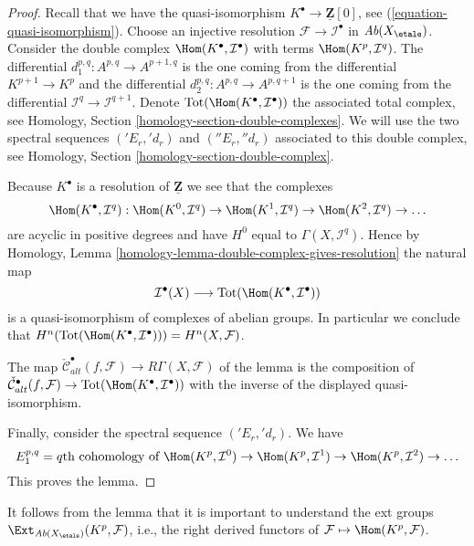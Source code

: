 \begin{proof}
Recall that we have the quasi-isomorphism
$K^\bullet \to \underline{\mathbf{Z}}[0]$, see
(\ref{equation-quasi-isomorphism}).
Choose an injective resolution $\mathcal{F} \to \mathcal{I}^\bullet$
in $\textit{Ab}(X_\etale)$. Consider the double complex
$\Hom(K^\bullet, \mathcal{I}^\bullet)$ with terms
$\Hom(K^p, \mathcal{I}^q)$. The differential
$d_1^{p, q} : A^{p, q} \to A^{p + 1, q}$
is the one coming from the differential $K^{p + 1} \to K^p$
and the differential $d_2^{p, q} : A^{p, q} \to A^{p, q + 1}$ is the
one coming from the differential
$\mathcal{I}^q \to \mathcal{I}^{q + 1}$.
Denote $\text{Tot}(\Hom(K^\bullet, \mathcal{I}^\bullet))$
the associated total complex, see
Homology, Section \ref{homology-section-double-complexes}.
We will use the two spectral
sequences $({}'E_r, {}'d_r)$ and $({}''E_r, {}''d_r)$
associated to this double complex, see
Homology, Section \ref{homology-section-double-complex}.

\medskip\noindent
Because $K^\bullet$ is a resolution of $\underline{\mathbf{Z}}$
we see that the complexes
$$
\Hom(K^\bullet, \mathcal{I}^q) :
\Hom(K^0, \mathcal{I}^q) \to
\Hom(K^1, \mathcal{I}^q) \to
\Hom(K^2, \mathcal{I}^q) \to \ldots
$$
are acyclic in positive degrees and have $H^0$ equal to
$\Gamma(X, \mathcal{I}^q)$. Hence by
Homology, Lemma \ref{homology-lemma-double-complex-gives-resolution}
the natural map
$$
\mathcal{I}^\bullet(X) \longrightarrow
\text{Tot}(\Hom(K^\bullet, \mathcal{I}^\bullet))
$$
is a quasi-isomorphism of complexes of abelian groups. In particular
we conclude that
$H^n(\text{Tot}(\Hom(K^\bullet, \mathcal{I}^\bullet))) = H^n(X, \mathcal{F})$.

\medskip\noindent
The map $\check{\mathcal{C}}^\bullet_{alt}(f, \mathcal{F}) \to
R\Gamma(X, \mathcal{F})$ of the lemma is the composition of
$\check{\mathcal{C}}^\bullet_{alt}(f, \mathcal{F}) \to
\text{Tot}(\Hom(K^\bullet, \mathcal{I}^\bullet))$
with the inverse of the displayed quasi-isomorphism.

\medskip\noindent
Finally, consider the spectral sequence $({}'E_r, {}'d_r)$.
We have
$$
E_1^{p, q} = q\text{th cohomology of }
\Hom(K^p, \mathcal{I}^0) \to
\Hom(K^p, \mathcal{I}^1) \to
\Hom(K^p, \mathcal{I}^2) \to \ldots
$$
This proves the lemma.
\end{proof}

\noindent
It follows from the lemma that it is important to understand the
ext groups $\Ext_{\textit{Ab}(X_\etale)}(K^p, \mathcal{F})$,
i.e., the right derived functors of
$\mathcal{F} \mapsto \Hom(K^p, \mathcal{F})$.

